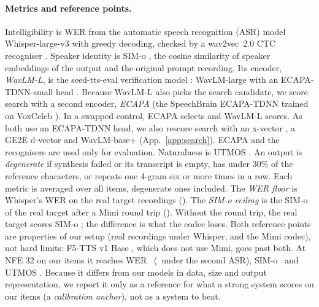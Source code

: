 \paragraph{Metrics and reference points.}
Intelligibility is WER from the automatic speech recognition (ASR) model Whisper-large-v3
\citep{whisper} with greedy decoding, checked by a wav2vec~2.0 CTC recogniser
\citep{wav2vec2,xu2021selftraining}. Speaker identity is SIM-o
\citep{voicebox}, the cosine similarity of speaker embeddings of the output and the original
prompt recording. Its encoder, \emph{WavLM-L}, is the seed-tts-eval verification model
\citep{seedtts}: WavLM-large \citep{wavlm} with an ECAPA-TDNN-small head \citep{ecapa}.
Because WavLM-L also picks the search candidate, we score search with a second encoder,
\emph{ECAPA} (the SpeechBrain \citep{speechbrain} ECAPA-TDNN \citep{ecapa} trained on VoxCeleb
\citep{voxceleb1,voxceleb2}).
In a swapped control, ECAPA selects and WavLM-L scores. As both use an ECAPA-TDNN head, we
also rescore search with an x-vector \citep{xvector}, a GE2E d-vector \citep{ge2e} and
WavLM-base+ \citep{wavlm} (App.~\ref{app:search}). ECAPA and the recognisers are used only
for evaluation. Naturalness is UTMOS \citep{utmos}. An output is \emph{degenerate} if
synthesis failed or its transcript is empty, has under 30\% of the reference characters, or
repeats one 4-gram six or more times in a row. Each metric is averaged over all items,
degenerate ones included. The \emph{WER floor} is Whisper's WER on the real target recordings
(\NwerFloor). The \emph{SIM-o ceiling} is the SIM-o of the real target after a Mimi round
trip (\NsimCeiling). Without the round trip, the real target scores SIM-o \NsimRealAudio;
the difference is what the codec loses. Both reference points are properties of our setup
(real recordings under Whisper, and the Mimi codec), not hard limits: F5-TTS v1 Base
\citep{f5tts}, which does not use Mimi, goes past both. At NFE 32 on our items it reaches WER \NcrsFfWER\
(\NcrsFfWERasrTwo\ under the second ASR), SIM-o \NcrsFfSIM\ and UTMOS \NcrsFfUTMOS. Because
it differs from our models in data, size and output representation, we report it only as a
reference for what a strong system scores on our items (a \emph{calibration anchor}), not as
a system to beat.

